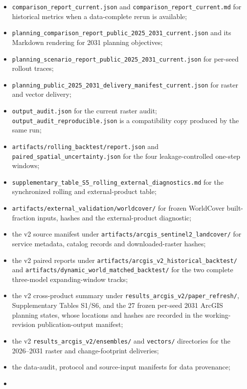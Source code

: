 \begin{itemize}
\tightlist
\item
  \texttt{comparison\_report\_current.json} and
  \texttt{comparison\_report\_current.md} for historical metrics when a
  data-complete rerun is available;
\item
  \texttt{planning\_comparison\_report\_public\_2025\_2031\_current.json}
  and its Markdown rendering for 2031 planning objectives;
\item
  \texttt{planning\_scenario\_report\_public\_2025\_2031\_current.json}
  for per-seed rollout traces;
\item
  \texttt{planning\_public\_2025\_2031\_delivery\_manifest\_current.json}
  for raster and vector delivery;
\item
  \texttt{output\_audit.json} for the current raster audit;
  \texttt{output\_audit\_reproducible.json} is a compatibility copy
  produced by the same run;
\item
  \texttt{artifacts/rolling\_backtest/report.json} and
  \texttt{paired\_spatial\_uncertainty.json} for the four
  leakage-controlled one-step windows;
\item
  \texttt{supplementary\_table\_S5\_rolling\_external\_diagnostics.md}
  for the synchronized rolling and external-product table;
\item
  \texttt{artifacts/external\_validation/worldcover/} for frozen
  WorldCover built-fraction inputs, hashes and the external-product
  diagnostic;
\item
  the v2 source manifest under
  \texttt{artifacts/arcgis\_sentinel2\_landcover/} for service metadata,
  catalog records and downloaded-raster hashes;
\item
  the v2 paired reports under
  \texttt{artifacts/arcgis\_v2\_historical\_backtest/} and
  \texttt{artifacts/dynamic\_world\_matched\_backtest/} for the two
  complete three-model expanding-window tracks;
\item
  the v2 cross-product summary under
  \texttt{results\_arcgis\_v2/paper\_refresh/}, Supplementary Tables
  S1/S6, and the 27 frozen per-seed 2031 ArcGIS planning states, whose
  locations and hashes are recorded in the working-revision
  publication-output manifest;
\item
  the v2 \texttt{results\_arcgis\_v2/ensembles/} and \texttt{vectors/}
  directories for the 2026--2031 raster and change-footprint deliveries;
\item
  the data-audit, protocol and source-input manifests for data
  provenance;
\item

\end{itemize}

